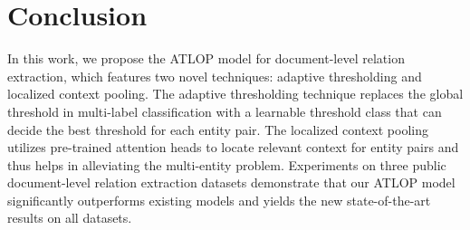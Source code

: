 \documentclass[letterpaper]{article}
\begin{document}
\section{Conclusion}
In this work, we propose the ATLOP model for document-level relation extraction, which features two novel techniques: adaptive thresholding and localized context pooling.
The adaptive thresholding technique replaces the global threshold in multi-label classification with a learnable threshold class that can decide the best threshold for each entity pair.
The localized context pooling utilizes pre-trained attention heads to locate relevant context for entity pairs and thus helps in alleviating the multi-entity problem.
Experiments on three public document-level relation extraction datasets demonstrate that our ATLOP model significantly outperforms existing models and yields the new state-of-the-art results on all datasets.


\end{document}
